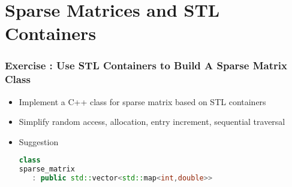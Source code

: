 \documentclass{beamer}
\begin{document}
\section{Sparse Matrices and STL Containers}

\begin{frame}[fragile]
\frametitle{Exercise : Use STL Containers to Build A Sparse Matrix Class}
\begin{itemize}
\item Implement a C++ class for sparse matrix based on STL containers
\item Simplify random access, allocation, entry increment, sequential traversal
\item Suggestion \small
\begin{lstlisting}[language=C++]
class 
sparse_matrix 
   : public std::vector<std::map<int,double>>
\end{lstlisting}\normalsize
\end{itemize}
\end{frame}
\end{document}
